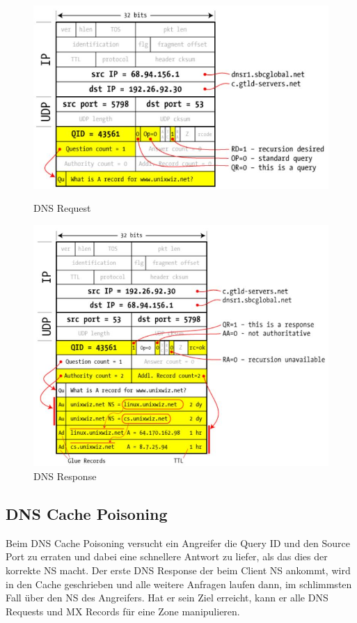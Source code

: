 \begin{figure}[ht!]
	\centering
	\begin{minipage}[t]{0.4\textwidth}
		\centering
		\includegraphics[width=\linewidth]{images/dns_request}
		\caption{DNS Request}
		\label{fig:dnsrequest}
	\end{minipage}
	\begin{minipage}[t]{0.4\textwidth}
		\centering
		\includegraphics[width=\linewidth]{images/dns_response}
		\caption{DNS Response}
		\label{fig:dnsresponse}
	\end{minipage}
\end{figure}

\subsection{DNS Cache Poisoning}
Beim DNS Cache Poisoning versucht ein Angreifer die Query ID und den Source Port zu erraten und dabei eine schnellere Antwort zu liefer, als das dies der korrekte NS macht. Der erste DNS Response der beim Client NS ankommt, wird in den Cache geschrieben und alle weitere Anfragen laufen dann, im schlimmsten Fall über den NS des Angreifers. Hat er sein Ziel erreicht, kann er alle DNS Requests und MX Records für eine Zone manipulieren.

